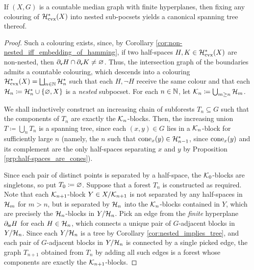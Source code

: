 \documentclass[reqno]{amsart}
\begin{document}
    \begin{proposition}\label{prp:canonical_spanning_trees}
        If $(X,G)$ is a countable median graph with finite hyperplanes, then fixing any colouring of $\mc{H}_\mathrm{cvx}^\ast(X)$ into nested sub-pocsets yields a canonical spanning tree thereof.
    \end{proposition}
    \begin{proof}
        Such a colouring exists, since, by Corollary \ref{cor:non-nested_iff_embedding_of_hamming}, if two half-spaces $H,K\in\mc{H}^\ast_\mathrm{cvx}(X)$ are non-nested, then $\del_\mathsf{v}H\cap\del_\mathsf{v}K\neq\em$. Thus, the intersection graph of the boundaries admits a countable colouring, which descends into a colouring $\mc{H}^\ast_\mathrm{cvx}(X)=\bigsqcup_{n\in\N}\mc{H}^\ast_n$ such that each $H,\lnot H$ receive the same colour and that each $\mc{H}_n\coloneqq\mc{H}_n^\ast\cup\l\{\em,X\r\}$ is a \textit{nested} subpocset. For each $n\in\N$, let $\mc{K}_n\coloneqq\bigcup_{m\geq n}\mc{H}_m$.

        We shall inductively construct an increasing chain of subforests $T_n\subseteq G$ such that the components of $T_n$ are exactly the $\mc{K}_n$-blocks. Then, the increasing union $T\coloneqq\bigcup_nT_n$ is a spanning tree, since each $(x,y)\in G$ lies in a $\mc{K}_n$-block for sufficiently large $n$ (namely, the $n$ such that $\cone_x(y)\in\mc{H}^\ast_{n-1}$, since $\cone_x(y)$ and its complement are the only half-spaces separating $x$ and $y$ by Proposition \ref{prp:half-spaces_are_cones}).

        Since each pair of distinct points is separated by a half-space, the $\mc{K}_0$-blocks are singletons, so put $T_0\coloneqq\em$. Suppose that a forest $T_n$ is constructed as required. Note that each $\mc{K}_{n+1}$-block $Y\in X/\mc{K}_{n+1}$ is not separated by any half-spaces in $\mc{H}_m$ for $m>n$, but is separated by $\mc{H}_n$ into the $\mc{K}_n$-blocks contained in $Y$, which are precisely the $\mc{H}_n$-blocks in $Y/\mc{H}_n$. Pick an edge from the \textit{finite} hyperplane $\del_\mathsf{ie}H$ for each $H\in\mc{H}_n$, which connects a unique pair of $G$-adjacent blocks in $Y/\mc{H}_n$. Since each $Y/\mc{H}_n$ is a tree by Corollary \ref{cor:nested_implies_tree}, and each pair of $G$-adjacent blocks in $Y/\mc{H}_n$ is connected by a single picked edge, the graph $T_{n+1}$ obtained from $T_n$ by adding all such edges is a forest whose components are exactly the $\mc{K}_{n+1}$-blocks.
    \end{proof}
\end{document}
